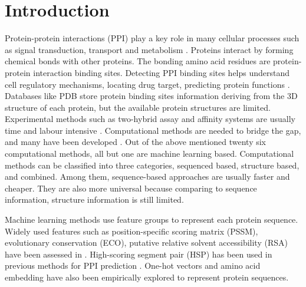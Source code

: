 \documentclass{bioinfo}
\begin{document}
\maketitle

\section{Introduction}
Protein-protein interactions (PPI) play a key role in many cellular processes such as signal transduction, transport and metabolism \citep{zhang2018review}. Proteins interact by forming chemical bonds with other proteins. The bonding amino acid residues are protein-protein interaction binding sites. Detecting PPI binding sites helps understand cell regulatory mechanisms, locating drug target, predicting protein functions \citep{bonetta2010interactome}. Databases like PDB \citep{berman2002protein} store protein binding sites information deriving from the 3D structure of each protein, but the available protein structures are limited. Experimental methods such as two-hybrid assay and affinity systems are usually time and labour intensive \citep{shoemaker2007deciphering}. Computational methods are needed to bridge the gap, and many have been developed \citep{cao2006enhanced, ofran2007isis, du2009improved, chen2009sequence, london2010structural, chen2010sequence, murakami2010applying, xue2011homppi, amos2011binding, jones2012psicov, asadabadi2013predictions, singh2014springs, wang2014fast, geng2015prediction, laine2015local, hwang2016hybrid, maheshwari2015prediction, liu2016prediction, wei2016protein, maheshwari2016template, jia2016ippbs, zhang2019sequence, wang2019protein, zhang2019scriber, zeng2019protein, xie2020prediction}. Out of the above mentioned twenty six computational methods, all but one are machine learning based. Computational methods can be classified into three categories, sequenced based, structure based, and combined. Among them, sequence-based approaches are usually faster and cheaper. They are also more universal because comparing to sequence information, structure information is still limited. 

Machine learning methods use feature groups to represent each protein sequence. Widely used features such as position-specific scoring matrix (PSSM), evolutionary conservation (ECO), putative relative solvent accessibility (RSA) have been assessed in \citep{zhang2019comprehensive}. High-scoring segment pair (HSP) has been used in previous methods for PPI prediction \citep{li2017sprint}. One-hot vectors \citep{zhang2019sequence, zeng2019protein} and amino acid embedding \citep{asgari2015continuous, heinzinger2019modeling, asgari2019probabilistic} have also been empirically explored to represent protein sequences.
\end{document}
